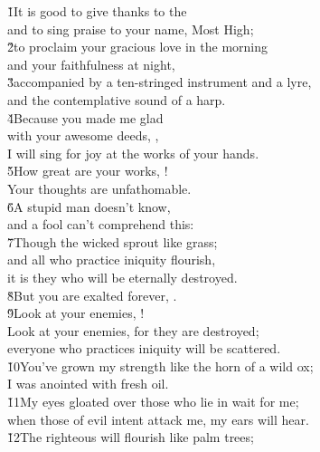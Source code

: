 \begin{poetry}
\poeml \v{1}It is good to give thanks to the  \\
\poemll    and to sing praise to your name, Most High; \\
\poeml \v{2}to proclaim your gracious love in the morning \\
\poemll    and your faithfulness at night, \\
\poeml \v{3}accompanied by a ten-stringed instrument and a lyre, \\
\poemll    and the contemplative sound of a harp. \\
\poeml \v{4}Because you made me glad \\
\poemll    with your awesome deeds, , \\
\poemlll       I will sing for joy at the works of your hands. \\
\poeml \v{5}How great are your works, ! \\
\poemll    Your thoughts are unfathomable. \\
\poeml \v{6}A stupid man doesn't know, \\
\poemll    and a fool can't comprehend this: \\
\poeml \v{7}Though the wicked sprout like grass; \\
\poemll    and all who practice iniquity flourish, \\
\poemlll       it is they who will be eternally destroyed. \\
\poeml \v{8}But you are exalted forever, . \\
\poeml \v{9}Look at your enemies, ! \\
\poemll    Look at your enemies, for they are destroyed; \\
\poemlll       everyone who practices iniquity will be scattered. \\
\poeml \v{10}You've grown my strength like the horn of a wild ox; \\
\poemll    I was anointed with fresh oil. \\
\poeml \v{11}My eyes gloated over those who lie in wait for me; \\
\poemll    when those of evil intent attack me, my ears will hear. \\
\poeml \v{12}The righteous will flourish like palm trees; \\

\end{poetry}
